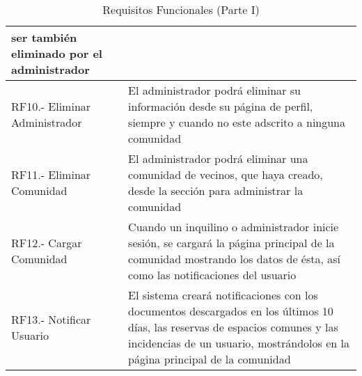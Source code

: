 \begin{appendices}
\begin{table}[H]
\begin{center}
\begin{tabular}{| p{5cm} | p{10cm} |}
			ser también eliminado por el administrador  \\ \hline
			RF10.- Eliminar Administrador & El administrador podrá eliminar su información desde su página de perfil, siempre y cuando no este adscrito a ninguna comunidad  \\ \hline
			RF11.- Eliminar Comunidad &  El administrador podrá eliminar una comunidad de vecinos, que
			haya creado, desde la sección para administrar la comunidad  \\ \hline
			RF12.- Cargar Comunidad & Cuando un inquilino o administrador inicie sesión, se cargará la página
			principal de la comunidad mostrando los datos de ésta, así como las notificaciones del usuario  \\ \hline
			RF13.- Notificar Usuario &  El sistema creará notificaciones con los documentos descargados en
			los últimos 10 días, las reservas de espacios comunes y las incidencias de un usuario, mostrándolos
			en la página principal de la comunidad  \\ \hline
		\end{tabular}	
		\egroup
		\caption{Requisitos Funcionales (Parte I)}	
	\end{center}
\end{table}  


\end{appendices}
